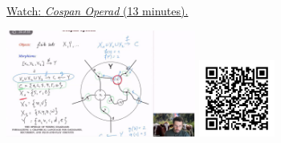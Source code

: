 
\begin{minipage}{10cm}
    \href{https://act4e-spring21.netlify.app/videos/spring2021-operads-b:co-span-operad.html}{Watch: \emph{Cospan Operad} (13 minutes).}
        
    \href{https://act4e-spring21.netlify.app/videos/spring2021-operads-b:co-span-operad.html}{\includegraphics[height=3.5cm]{spring2021-operads-b:co-span-operad/thumbnails.jpg}}
    \href{https://act4e-spring21.netlify.app/videos/spring2021-operads-b:co-span-operad.html}{\includegraphics[height=2.5cm]{spring2021-operads-b:co-span-operad/qrcode.png}}
\end{minipage}
